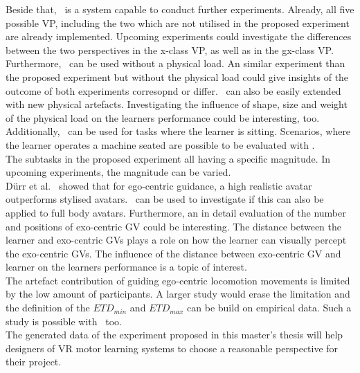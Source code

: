 Beside that, \exgo\ is a system capable to conduct further experiments. Already, all five possible VP, including the two which are not utilised in the proposed experiment are already implemented. Upcoming experiments could investigate the differences between the two perspectives in the x-class VP, as well as in the gx-class VP.\\
Furthermore, \exgo\ can be used without a physical load. An similar experiment than the proposed experiment but without the physical load could give insights of the outcome of both experiments corresopnd or differ. \exgo\ can also be easily extended with new physical artefacts. Investigating the influence of shape, size and weight of the physical load on the learners performance could be interesting, too. Additionally, \exgo\ can be used for tasks where the learner is sitting. Scenarios, where the learner operates a machine seated are possible to be evaluated with \exgo.\\
The subtasks in the proposed experiment all having a specific magnitude. In upcoming experiments, the magnitude can be varied.\\
Dürr et al.~\cite{max} showed that for ego-centric guidance, a high realistic avatar outperforms stylised avatars. \exgo\ can be used to investigate if this can also be applied to full body avatars. Furthermore, an in detail evaluation of the number and positions of exo-centric GV could be interesting. The distance between the learner and exo-centric GVs plays a role on how the learner can visually percept the exo-centric GVs. The influence of the distance between exo-centric GV and learner on the learners performance is a topic of interest.\\
The artefact contribution of guiding ego-centric locomotion movements is limited by the low amount of participants. A larger study would erase the limitation and the definition of the $ETD_{min}$ and $ETD_{max}$ can be build on empirical data. Such a study is possible with \exgo\, too.\\

The generated data of the experiment proposed in this master's thesis will help designers of VR motor learning systems to choose a reasonable perspective for their project.
